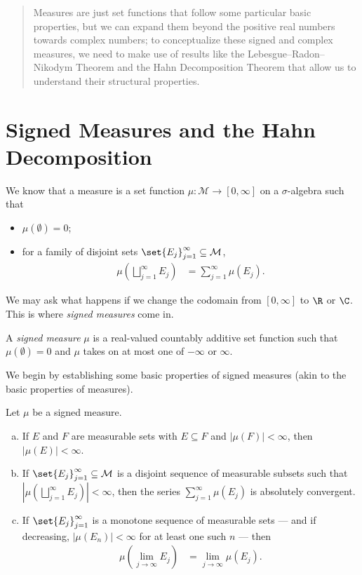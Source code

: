 \documentclass[10pt]{mypackage}
\begin{document}
\RaggedRight
\begin{abstract}
  \noindent Measures are just set functions that follow some particular basic properties, but we can expand them beyond the positive real numbers towards complex numbers; to conceptualize these signed and complex measures, we need to make use of results like the Lebesgue--Radon--Nikodym Theorem and the Hahn Decomposition Theorem that allow us to understand their structural properties.
\end{abstract}
\section{Signed Measures and the Hahn Decomposition}%
We know that a measure is a set function $\mu\colon \mathcal{M}\rightarrow [0,\infty]$ on a $\sigma$-algebra such that
\begin{itemize}
  \item $\mu\left( \emptyset \right) = 0$;
  \item for a family of disjoint sets $\set{E_j}_{j=1}^{\infty}\subseteq \mathcal{M}$,
    \begin{align*}
      \mu\left( \bigsqcup_{j=1}^{\infty}E_j \right) &= \sum_{j=1}^{\infty}\mu\left( E_j \right).
    \end{align*}
\end{itemize}
We may ask what happens if we change the codomain from $[0,\infty]$ to $\R$ or $\C$. This is where \textit{signed measures} come in.
\begin{definition}
  A \textit{signed measure} $\mu$ is a real-valued countably additive set function such that $\mu\left( \emptyset \right) = 0$ and $\mu$ takes on at most one of $-\infty$ or $\infty$.
\end{definition}
We begin by establishing some basic properties of signed measures (akin to the basic properties of measures).
\begin{theorem}
  Let $\mu$ be a signed measure.
  \begin{enumerate}[(a)]
    \item If $E$ and $F$ are measurable sets with $E\subseteq F$ and $\left\vert \mu\left( F \right) \right\vert < \infty$, then $\left\vert \mu\left( E \right) \right\vert < \infty$.
    \item If $\set{E_j}_{j=1}^{\infty}\subseteq \mathcal{M}$ is a disjoint sequence of measurable subsets such that $\left\vert \mu\left( \bigsqcup_{j=1}^{\infty}E_j \right) \right\vert < \infty$, then the series $\sum_{j=1}^{\infty}\mu\left( E_j \right)$ is absolutely convergent.
    \item If $\set{E_j}_{j=1}^{\infty}$ is a monotone sequence of measurable sets --- and if decreasing, $\left\vert \mu\left( E_n \right) \right\vert < \infty$ for at least one such $n$ --- then 
      \begin{align*}
        \mu\left( \lim_{j\rightarrow\infty} E_j \right) &= \lim_{j\rightarrow\infty}\mu\left( E_j \right).
      \end{align*}
  \end{enumerate}
\end{theorem}
\end{document}
